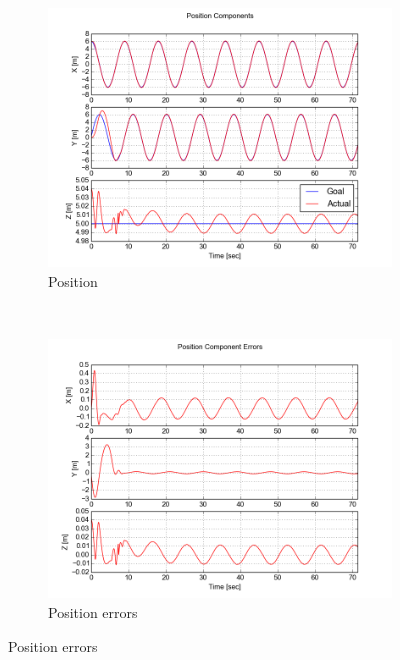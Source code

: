 \documentclass[paper=letter, fontsize=11pt]{scrartcl} %
\numberwithin{equation}{section} %
\numberwithin{figure}{section} %
\numberwithin{table}{section} %
\begin{document}
\begin{figure}[h]
  \centering
  \begin{subfigure}[b]{0.45\textwidth}
    \includegraphics[width=\textwidth]{circle_position}
    \caption{Position}
    \label{fig:circle_position}
  \end{subfigure}%
  ~ %
  \begin{subfigure}[b]{0.45\textwidth}
    \includegraphics[width=\textwidth]{circle_position_errors}
    \caption{Position errors}
    \label{fig:circle_position_errors}
  \end{subfigure}


\end{figure}
\end{document}
